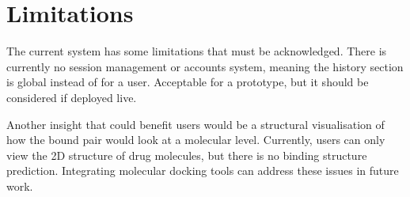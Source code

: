 \section{Limitations}
The current system has some limitations that must be acknowledged.
There is currently no session management or accounts system, meaning the history section is global instead of for a user.
Acceptable for a prototype, but it should be considered if deployed live.

Another insight that could benefit users would be a structural visualisation of how the bound pair would look at a molecular level.
Currently, users can only view the 2D structure of drug molecules, but there is no binding structure prediction.
Integrating molecular docking tools can address these issues in future work.
